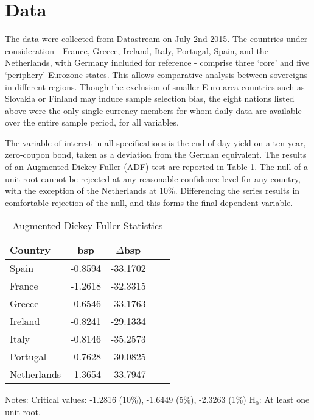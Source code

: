 \documentclass[/../base.tex]{subfiles}
\begin{document}
\section{Data}
\label{data}

The data were collected from Datastream on July 2nd 2015. The countries under consideration - France, Greece, Ireland, Italy, Portugal, Spain, and the Netherlands, with Germany included for reference - comprise three `core' and five `periphery' Eurozone states. This allows comparative analysis between sovereigns in different regions. Though the exclusion of smaller Euro-area countries such as Slovakia or Finland may induce sample selection bias, the eight nations listed above were the only single currency members for whom daily data are available over the entire sample period, for all variables. 

The variable of interest in all specifications is the end-of-day yield on a ten-year, zero-coupon bond, taken as a deviation from the German equivalent. The results of an Augmented Dickey-Fuller (ADF) test are reported in Table \ref{tab:adf}. The null of a unit root cannot be rejected at any reasonable confidence level for any country, with the exception of the Netherlands at 10\%. Differencing the series results in comfortable rejection of the null, and this forms the final dependent variable.  

\begin{table}[h]
	\centering
	\begin{threeparttable}
		\caption{Augmented Dickey Fuller Statistics}
		\begin{tabular}{l c*{3}{c}}
			\toprule
			\toprule
			Country & bsp & $\Delta$bsp\\
			\midrule
			Spain     &   -0.8594 &   -33.1702  \\
			France  &   -1.2618 &   -32.3315\\
			Greece &   -0.6546 &   -33.1763  \\
			Ireland   &   -0.8241 &   -29.1334 \\
			Italy     &   -0.8146 &   -35.2573 \\
			Portugal  &   -0.7628 &   -30.0825\\
			Netherlands &   -1.3654 &   -33.7947  \\
			\bottomrule
			\bottomrule
		\end{tabular}
		\centering
		\begin{tablenotes}
			\small
			\item Notes: Critical values: -1.2816 (10\%), -1.6449 (5\%), -2.3263 (1\%) H$_0$: At least one unit root.
		\end{tablenotes}
		\label{tab:adf}
	\end{threeparttable}
\end{table}
\end{document}
